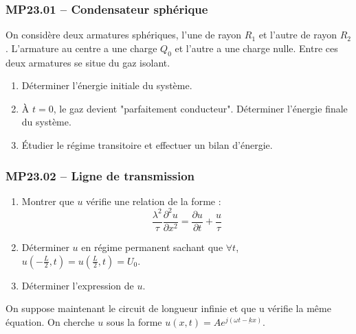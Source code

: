 \subsubsection*{MP23.01 -- Condensateur sphérique  }

On considère deux armatures sphériques, l'une de rayon $R_1$ et l'autre de rayon $R_2$. L'armature au centre a une charge $Q_0$ et l'autre a une charge nulle. Entre ces deux armatures se situe du gaz isolant.

\begin{enumerate}
    \item Déterminer l'énergie initiale du système.
    \item À $t=0$, le gaz devient "parfaitement conducteur". Déterminer l'énergie finale du système.
    \item Étudier le régime transitoire et effectuer un bilan d'énergie.
\end{enumerate}

\newpage
\subsubsection*{MP23.02 -- Ligne de transmission  \corrige}

\begin{center}
\end{center}

\begin{enumerate}
    \item Montrer que $u$ vérifie une relation de la forme :
    \[
    \frac{\lambda^2}{\tau} \frac{\partial^2 u}{\partial x^2} = \frac{\partial u}{\partial t} + \frac{u}{\tau}
    \]
    \item Déterminer $u$ en régime permanent sachant que $\forall t$, $u\left(-\frac{L}{2}, t\right) = u\left(\frac{L}{2}, t\right) = U_0$.
    \item Déterminer l'expression de $u$.
\end{enumerate}

On suppose maintenant le circuit de longueur infinie et que u vérifie la même équation. On cherche $u$ sous la forme $u(x,t)=Ae^{j(\omega t-\underbar{k} x)}$. 

